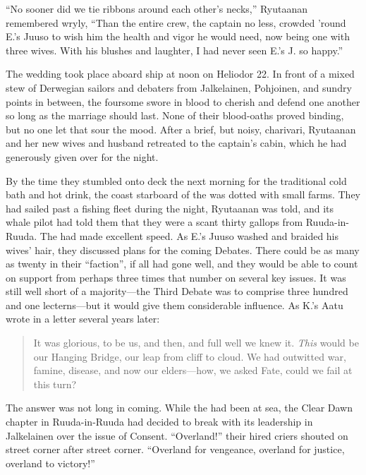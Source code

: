 \documentclass[12pt]{report}
\begin{document}
``No sooner did we tie ribbons around each other's necks,'' Ryutaanan
remembered wryly, ``Than the entire crew, the captain no less, crowded
'round E.'s Juuso to wish him the health and vigor he would need, now
being one with three wives.  With his blushes and laughter, I had
never seen E.'s J. so happy.''

The wedding took place aboard ship at noon on Heliodor 22.  In front
of a mixed stew of Derwegian sailors and debaters from Jalkelainen,
Pohjoinen, and sundry points in between, the foursome swore in blood
to cherish and defend one another so long as the marriage should last.
None of their blood-oaths proved binding, but no one let that sour the
mood.  After a brief, but noisy, charivari, Ryutaanan and her new
wives and husband retreated to the captain's cabin, which he had
generously given over for the night.

By the time they stumbled onto deck the next morning for the
traditional cold bath and hot drink, the coast starboard of the
 was dotted with small farms.  They had sailed past a
fishing fleet during the night, Ryutaanan was told, and its whale
pilot had told them that they were a scant thirty gallops from
Ruuda-in-Ruuda.  The  had made excellent speed.  As E.'s
Juuso washed and braided his wives' hair, they discussed plans for the
coming Debates.  There could be as many as twenty in their ``faction'',
if all had gone well, and they would be able to count on support from
perhaps three times that number on several key issues.  It was still
well short of a majority---the Third Debate was to comprise three
hundred and one lecterns---but it would give them considerable
influence.  As K.'s Aatu wrote in a letter several years later:

\begin{quotation}
It was glorious, to be us, and then, and full well we knew it.
\emph{This} would be our Hanging Bridge, our leap from cliff to cloud.
We had outwitted war, famine, disease, and now our elders---how, we
asked Fate, could we fail at this turn?
\end{quotation}

The answer was not long in coming.  While the  had been at
sea, the Clear Dawn chapter in Ruuda-in-Ruuda had decided to break
with its leadership in Jalkelainen over the issue of Consent.
``Overland!''  their hired criers shouted on street corner after street
corner.  ``Overland for vengeance, overland for justice, overland to
victory!''
\end{document}
